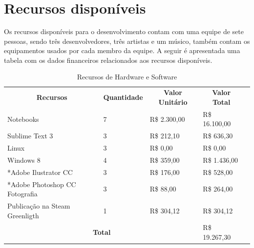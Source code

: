 \documentclass[a4paper,11pt]{article}
\begin{document}
\section{Recursos disponíveis}

Os recursos disponíveis para o desenvolvimento contam com uma equipe de sete pessoas, sendo três desenvolvedores, três artistas e um músico, também contam os equipamentos usados por cada membro da equipe. A seguir é apresentada uma tabela com os dados financeiros relacionados aos recursos disponíveis.

\begin{table}[h]
\centering
\begin{tabular}{|l|l|l|l|l}
\cline{1-4}
\multicolumn{1}{|c|}{\textbf{Recursos}} & \multicolumn{1}{c|}{\textbf{Quantidade}} & \multicolumn{1}{c|}{\textbf{Valor Unitário}} & \multicolumn{1}{c|}{\textbf{Valor Total}} &  \\ \cline{1-4}
Notebooks                               & 7                                        & R\$ 2.300,00                                  & R\$ 16.100,00                             &  \\ \cline{1-4}
Sublime Text 3                          & 3                                        & R\$ 212,10                                   & R\$ 636,30                                &  \\ \cline{1-4}
Linux                                   & 3                                        & R\$ 0,00                                     & R\$ 0,00                                  &  \\ \cline{1-4}
Windows 8                               & 4                                        & R\$ 359,00                                   & R\$ 1.436,00                              &  \\ \cline{1-4}
*Adobe Ilustrator CC                    & 3                                        & R\$ 176,00                                   & R\$ 528,00                                &  \\ \cline{1-4}
*Adobe Photoshop CC Fotografia          & 3                                        & R\$ 88,00                                    & R\$ 264,00                                &  \\ \cline{1-4}
Publicação na Steam Greenligth          & 1                                        & R\$ 304,12                                   & R\$ 304,12                                &  \\ \cline{1-4}
\multicolumn{3}{|c|}{\textbf{Total}}                                                                                              & R\$ 19.267,30                             &  \\ \cline{1-4}
\end{tabular}
\caption {Recursos de Hardware e Software}
\end{table}
\end{document}

